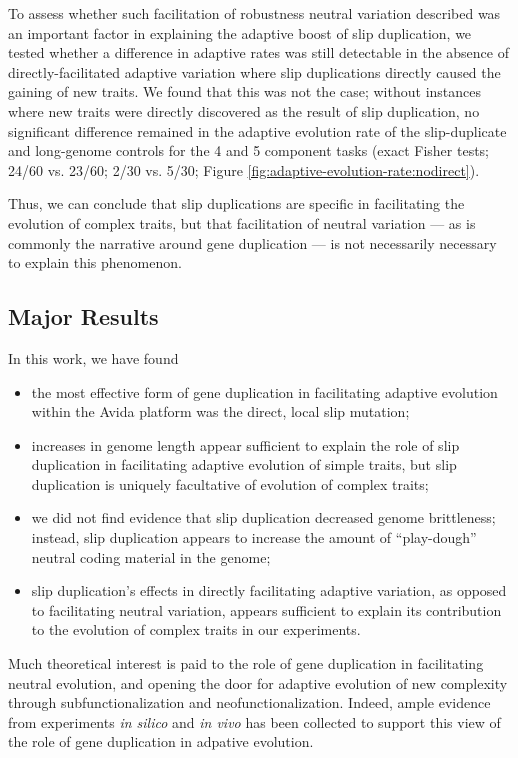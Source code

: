 To assess whether such facilitation of robustness neutral variation described  was an important factor in explaining the adaptive boost of slip duplication, we tested whether a difference in adaptive rates was still detectable in the absence of directly-facilitated adaptive variation where slip duplications directly caused the gaining of new traits.
We found that this was not the case; without instances where new traits were directly discovered as the result of slip duplication, no significant difference remained in the adaptive evolution rate of the slip-duplicate and long-genome controls for the 4 and 5 component tasks (exact Fisher tests; 24/60 vs. 23/60; 2/30 vs. 5/30; Figure \ref{fig:adaptive-evolution-rate:nodirect}).

Thus, we can conclude that slip duplications are specific in facilitating the evolution of complex traits, but that facilitation of neutral variation --- as is commonly the narrative around gene duplication --- is not necessarily necessary to explain this phenomenon.

\subsection{Major Results}

In this work, we have found
\begin{itemize}
\item the most effective form of gene duplication in facilitating adaptive evolution within the Avida platform was the direct, local slip mutation;
\item increases in genome length appear sufficient to explain the role of slip duplication in facilitating adaptive evolution of simple traits, but slip duplication is uniquely facultative of evolution of complex traits;
\item we did not find evidence that slip duplication decreased genome brittleness; instead, slip duplication appears to increase the amount of ``play-dough'' neutral coding material in the genome;
\item slip duplication's effects in directly facilitating adaptive variation, as opposed to facilitating neutral variation, appears sufficient to explain its contribution to the evolution of complex traits in our experiments.
\end{itemize}

Much theoretical interest is paid to the role of gene duplication in facilitating neutral evolution, and opening the door for adaptive evolution of new complexity through subfunctionalization and neofunctionalization.
Indeed, ample evidence from experiments \textit{in silico} and \textit{in vivo} has been collected to support this view of the role of gene duplication in adpative evolution.

